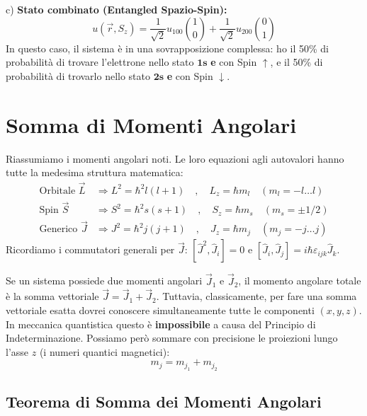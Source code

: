 \documentclass[11pt, a4paper]{article}
\begin{document}
c) \textbf{Stato combinato (Entangled Spazio-Spin):} %
\begin{equation*}
    u(\vec{r}, S_z) = \frac{1}{\sqrt{2}} u_{100} \binom{1}{0} + \frac{1}{\sqrt{2}} u_{200} \binom{0}{1} %
\end{equation*}
In questo caso, il sistema è in una sovrapposizione complessa: ho il 50\% di probabilità di trovare l'elettrone nello stato $\mathbf{1s}$ \textbf{e} con Spin $\mathbf{\uparrow}$, e il 50\% di probabilità di trovarlo nello stato $\mathbf{2s}$ \textbf{e} con Spin $\mathbf{\downarrow}$. %

\section{Somma di Momenti Angolari} %

Riassumiamo i momenti angolari noti. Le loro equazioni agli autovalori hanno tutte la medesima struttura matematica: %
\begin{align*}
    \text{Orbitale } \vec{L} &\Rightarrow L^2 = \hbar^2 l(l+1) \quad , \quad L_z = \hbar m_l \quad (m_l = -l \dots l) \\ %
    \text{Spin } \vec{S} &\Rightarrow S^2 = \hbar^2 s(s+1) \quad , \quad S_z = \hbar m_s \quad (m_s = \pm 1/2) \\ %
    \text{Generico } \vec{J} &\Rightarrow J^2 = \hbar^2 j(j+1) \quad , \quad J_z = \hbar m_j \quad (m_j = -j \dots j) %
\end{align*}
Ricordiamo i commutatori generali per $\vec{J}$: $[\hat{J}^2, \hat{J}_i] = 0$ e $[\hat{J}_i, \hat{J}_j] = i\hbar\varepsilon_{ijk}\hat{J}_k$. %

\noindent
Se un sistema possiede due momenti angolari $\vec{J}_1$ e $\vec{J}_2$, il momento angolare totale è la somma vettoriale $\vec{J} = \vec{J}_1 + \vec{J}_2$. %
Tuttavia, classicamente, per fare una somma vettoriale esatta dovrei conoscere simultaneamente tutte le componenti $(x, y, z)$. In meccanica quantistica questo è \textbf{impossibile} a causa del Principio di Indeterminazione. %
Possiamo però sommare con precisione le proiezioni lungo l'asse $z$ (i numeri quantici magnetici): %
\begin{equation*}
    m_j = m_{j_1} + m_{j_2} %
\end{equation*}

\subsection{Teorema di Somma dei Momenti Angolari} %
\end{document}
